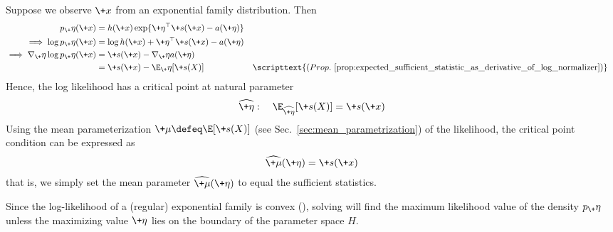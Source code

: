 \documentclass{article} %
\newcommand{\obs}{\+x}
\newcommand{\obsCaps}{X}
\newcommand{\logNormalizerFunction}{a}
\newcommand{\sufficientStatsFunction}{\+s}
\newcommand{\carrierDensity}{h}
\newcommand{\meanParam}{\+\mu}
\newcommand{\naturalParam}{\+\eta}
\newcommand{\naturalParamSpace}{H}
\begin{document}
Suppose we observe $\obs$ from an exponential family distribution. Then 
%
\begin{align*}
 p_\naturalParam(\obs) &= \carrierDensity(\obs) \exp \{ \naturalParam^\top \sufficientStatsFunction(\obs) - \logNormalizerFunction(\naturalParam)\}  \\
\implies \log  p_\naturalParam(\obs) &= \log \carrierDensity(\obs) +  \naturalParam^\top \sufficientStatsFunction(\obs) - \logNormalizerFunction(\naturalParam) \\
 \implies \nabla_\naturalParam \log  p_\naturalParam(\obs) &= \sufficientStatsFunction(\obs) - \nabla_\naturalParam \logNormalizerFunction(\naturalParam) 
 \\ &= \sufficientStatsFunction(\obs) - \E_\naturalParam[\sufficientStatsFunction(\obsCaps)] && \scripttext{(Prop.~ \ref{prop:expected_sufficient_statistic_as_derivative_of_log_normalizer})}
 \end{align*}
%
Hence, the log likelihood has a critical point at natural parameter 
%
\begin{align}
\widehat{\naturalParam} : \quad   \E_{\widehat{\naturalParam}}[\sufficientStatsFunction(\obsCaps)] = \sufficientStatsFunction(\obs)
\label{eqn:condition_for_critical_point_of_EF_likelihood}
\end{align}
% 
Using the mean parameterization $\meanParam \defeq \E[\sufficientStatsFunction(X)]$ (see Sec.~\ref{sec:mean_parametrization}) of the likelihood,  the critical point condition can be expressed as 
%
\begin{align}\widehat{\meanParam}(\naturalParam) = \sufficientStatsFunction(\obs)
\label{eqn:condition_for_critical_point_of_EF_likelihood__under_mean_parametrization}
\end{align}
% 
that is, we simply set the mean parameter $\widehat{\meanParam}(\naturalParam)$ to equal the sufficient statistics.

Since the log-likelihood of a (regular) exponential family is convex \citet[pp.~4]{dempster1977maximum} (), solving  will find the maximum likelihood value of the density $p_\naturalParam$ unless the maximizing value $\naturalParam$ lies on the boundary of the parameter space $\naturalParamSpace$.
\end{document}
